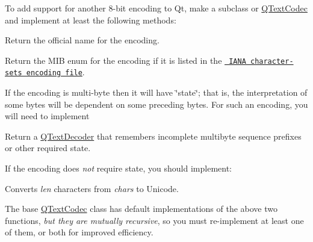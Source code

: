 To add support for another 8-\/bit encoding to Qt, make a subclass or \mbox{\hyperlink{class_q_text_codec}{Q\+Text\+Codec}} and implement at least the following methods\+: 
\begin{DoxyDescription}
\item[{\ttfamily const} char$\ast$ \mbox{\hyperlink{class_q_text_codec_a5b735ce19dc6b0fb0e8858bd3f54f0e2}{name() const}} ]Return the official name for the encoding. 
\item[{\ttfamily int} \mbox{\hyperlink{class_q_text_codec_aa0118daa4f82235ae9d5bb70a168c992}{mib\+Enum() const}} ]Return the M\+IB enum for the encoding if it is listed in the \href{ftp://ftp.isi.edu/in-notes/iana/assignments/character-sets}{\texttt{ I\+A\+NA character-\/sets encoding file}}. 
\end{DoxyDescription}If the encoding is multi-\/byte then it will have \char`\"{}state\char`\"{}; that is, the interpretation of some bytes will be dependent on some preceding bytes. For such an encoding, you will need to implement 
\begin{DoxyDescription}
\item[{\ttfamily Q\+Text\+Decoder$\ast$} \mbox{\hyperlink{class_q_text_codec_abb65882aa316a2ad49a10e9f86c4dc88}{make\+Decoder() const}} ]Return a \mbox{\hyperlink{class_q_text_decoder}{Q\+Text\+Decoder}} that remembers incomplete multibyte sequence prefixes or other required state. 
\end{DoxyDescription}If the encoding does {\itshape not} require state, you should implement\+: 
\begin{DoxyDescription}
\item[{\ttfamily \mbox{\hyperlink{class_q_string}{Q\+String}}} \mbox{\hyperlink{class_q_text_codec_aafe2c454ae7cbbf3d84a7ca26f775c49}{to\+Unicode(const char$\ast$ chars, int len) const}} ]Converts {\itshape len} characters from {\itshape chars} to Unicode. 
\end{DoxyDescription}The base \mbox{\hyperlink{class_q_text_codec}{Q\+Text\+Codec}} class has default implementations of the above two functions, {\itshape but they are mutually recursive}, so you must re-\/implement at least one of them, or both for improved efficiency.


